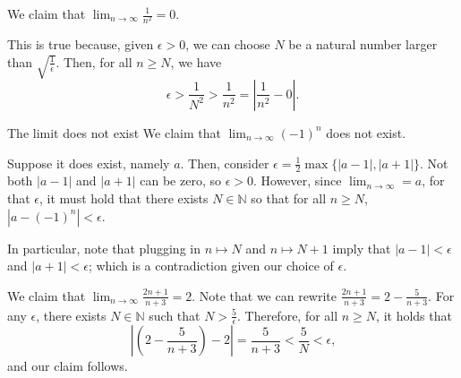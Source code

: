 \begin{exmp}{}{}
	We claim that \(\lim_{n\to\infty} \frac{1}{n^2} = 0\).

	This is true because, given \(\epsilon > 0\), we can choose \(N\) be a natural number larger than \(\sqrt{\frac{1}{\epsilon}}\). Then, for all \(n \geq N\), we have \[
		\epsilon > \frac{1}{N^2} > \frac{1}{n^2} = \left|\frac{1}{n^2} - 0\right|.
	\]
\end{exmp}

\begin{exmp}{The limit does not exist}{}
	We claim that \(\lim_{n\to\infty} (-1)^n\) does not exist.  

	Suppose it does exist, namely \(a\). Then, consider \(\epsilon = \frac{1}{2} \max\{|a - 1|, |a + 1|\}\). Not both \(|a - 1|\) and  \(|a + 1|\) can be zero, so  \(\epsilon > 0\). However, since \(\lim_{n\to\infty} = a\), for that \(\epsilon\), it must hold that there exists \(N \in \mathbb{N}\) so that for all \(n \geq N\), \(|a - (-1)^n| < \epsilon\).

	In particular, note that plugging in \(n \mapsto N\) and \(n\mapsto N+1\) imply that \(|a - 1| < \epsilon\) and \(|a + 1| < \epsilon\); which is a contradiction given our choice of \(\epsilon\).
\end{exmp}

\begin{exmp}{}{}
	We claim that \(\lim_{n\to\infty} \frac{2n+1}{n+3} = 2\). 
	Note that we can rewrite \(\frac{2n+1}{n+3} = 2 - \frac{5}{n+3}\). For any \(\epsilon\), there exists \(N \in \mathbb{N}\) such that \(N > \frac{5}{\epsilon}\). Therefore, for all \(n \geq N\), it holds that \[
		\left|\left(2 - \frac{5}{n+3}\right) - 2\right| = \frac{5}{n+3} < \frac{5}{N} < \epsilon\text{,}
	\]
	and our claim follows.
\end{exmp}
